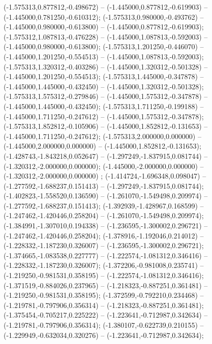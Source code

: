  (-1.575313,0.877812,-0.498672) -- (-1.445000,0.877812,-0.619903) -- (-1.445000,0.781250,-0.610312);
 (-1.575313,0.980000,-0.493762) -- (-1.445000,0.980000,-0.613800) -- (-1.445000,0.877812,-0.619903);
 (-1.575312,1.087813,-0.476228) -- (-1.445000,1.087813,-0.592003) -- (-1.445000,0.980000,-0.613800);
 (-1.575313,1.201250,-0.446070) -- (-1.445000,1.201250,-0.554513) -- (-1.445000,1.087813,-0.592003);
 (-1.575313,1.320312,-0.403286) -- (-1.445000,1.320312,-0.501328) -- (-1.445000,1.201250,-0.554513);
 (-1.575313,1.445000,-0.347878) -- (-1.445000,1.445000,-0.432450) -- (-1.445000,1.320312,-0.501328);
 (-1.575313,1.575312,-0.279846) -- (-1.445000,1.575312,-0.347878) -- (-1.445000,1.445000,-0.432450);
 (-1.575313,1.711250,-0.199188) -- (-1.445000,1.711250,-0.247612) -- (-1.445000,1.575312,-0.347878);
 (-1.575313,1.852812,-0.105906) -- (-1.445000,1.852812,-0.131653) -- (-1.445000,1.711250,-0.247612);
 (-1.575313,2.000000,0.000000) -- (-1.445000,2.000000,0.000000) -- (-1.445000,1.852812,-0.131653);
 (-1.428743,-1.843218,0.052647) -- (-1.297249,-1.837915,0.081744) -- (-1.320312,-2.000000,0.000000);
 (-1.445000,-2.000000,0.000000) -- (-1.320312,-2.000000,0.000000) ;
 (-1.414724,-1.696348,0.098047) -- (-1.277592,-1.688237,0.151413) -- (-1.297249,-1.837915,0.081744);
 (-1.402823,-1.558520,0.136590) -- (-1.261070,-1.549498,0.209974) -- (-1.277592,-1.688237,0.151413);
 (-1.392939,-1.428967,0.168599) -- (-1.247462,-1.420446,0.258204) -- (-1.261070,-1.549498,0.209974);
 (-1.384991,-1.307010,0.194338) -- (-1.236595,-1.300002,0.296721) -- (-1.247462,-1.420446,0.258204);
 (-1.378916,-1.192046,0.214012) -- (-1.228332,-1.187230,0.326007) -- (-1.236595,-1.300002,0.296721);
 (-1.374665,-1.083538,0.227777) -- (-1.222574,-1.081312,0.346416) -- (-1.228332,-1.187230,0.326007);
 (-1.372206,-0.981008,0.235741) -- (-1.219250,-0.981531,0.358195) -- (-1.222574,-1.081312,0.346416);
 (-1.371519,-0.884026,0.237965) -- (-1.218323,-0.887251,0.361481) -- (-1.219250,-0.981531,0.358195);
 (-1.372599,-0.792210,0.234468) -- (-1.219781,-0.797906,0.356314) -- (-1.218323,-0.887251,0.361481);
 (-1.375454,-0.705217,0.225222) -- (-1.223641,-0.712987,0.342634) -- (-1.219781,-0.797906,0.356314);
 (-1.380107,-0.622739,0.210155) -- (-1.229949,-0.632034,0.320276) -- (-1.223641,-0.712987,0.342634);
